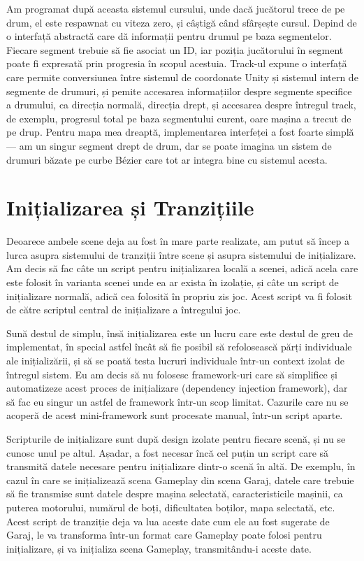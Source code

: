 \documentclass[a4paper,12pt]{report}
\begin{document}
Am programat după aceasta sistemul cursului, unde dacă jucătorul trece de pe drum, el este respawnat cu viteza zero, și câștigă când sfârșește cursul.
Depind de o interfață abstractă care dă informații pentru drumul pe baza segmentelor.
Fiecare segment trebuie să fie asociat un ID, iar poziția jucătorului în segment poate fi expresată prin progresia în scopul acestuia.
Track-ul expune o interfață care permite conversiunea între sistemul de coordonate Unity și sistemul intern de segmente de drumuri, și pemite accesarea informațiilor despre segmente specifice a drumului, ca direcția normală, direcția drept, și accesarea despre întregul track, de exemplu, progresul total pe baza segmentului curent, oare mașina a trecut de pe drup.
Pentru mapa mea dreaptă, implementarea interfeței a fost foarte simplă --- am un singur segment drept de drum, dar se poate imagina un sistem de drumuri băzate pe curbe Bézier care tot ar integra bine cu sistemul acesta.


\section{Inițializarea și Tranzițiile}

Deoarece ambele scene deja au fost în mare parte realizate, am putut să încep a lurca asupra sistemului de tranziții între scene și asupra sistemului de inițializare.
Am decis să fac câte un script pentru inițializarea locală a scenei, adică acela care este folosit în varianta scenei unde ea ar exista în izolație,
și câte un script de inițializare normală, adică cea folosită în propriu zis joc.
Acest script va fi folosit de către scriptul central de inițializare a întregului joc.

Sună destul de simplu, însă inițializarea este un lucru care este destul de greu de implementat,
în special astfel încât să fie posibil să refolosească părți individuale ale inițializării,
și să se poată testa lucruri individuale într-un context izolat de întregul sistem.
Eu am decis să nu folosesc framework-uri care să simplifice și automatizeze acest proces de inițializare (dependency injection framework),
dar să fac eu singur un astfel de framework într-un scop limitat.
Cazurile care nu se acoperă de acest mini-framework sunt procesate manual, într-un script aparte.

Scripturile de inițializare sunt după design izolate pentru fiecare scenă, și nu se cunosc unul pe altul.
Așadar, a fost necesar încă cel puțin un script care să transmită datele necesare pentru inițializare dintr-o scenă în altă.
De exemplu, în cazul în care se inițializează scena Gameplay din scena Garaj, datele care trebuie să fie transmise sunt datele despre mașina selectată, caracteristicile mașinii, ca puterea motorului, numărul de boți, dificultatea boților, mapa selectată, etc.
Acest script de tranziție deja va lua aceste date cum ele au fost sugerate de Garaj, le va transforma într-un format care Gameplay poate folosi pentru inițializare, și va inițializa scena Gameplay, transmitându-i aceste date.
\end{document}
